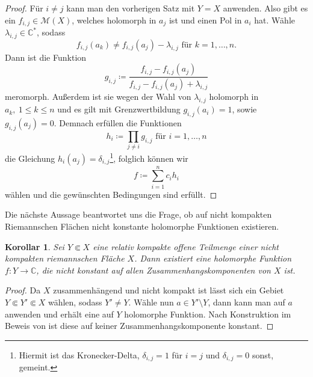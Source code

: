 \documentclass[11pt,a4paper,toc=bibliography]{scrartcl}
\theoremstyle{def}
\theoremstyle{thm}
\newtheorem{koro}[defi]{Korollar}
\theoremstyle{remark}
\begin{document}
\begin{proof}
Für $i\neq j$ kann man den vorherigen Satz mit $Y=X$ anwenden. Also gibt es ein $f_{i,j}\in\mathcal{M}(X)$, welches holomorph in $a_j$ ist und einen Pol in $a_i$ hat. Wähle $\lambda_{i,j}\in \mathbb{C}^*$, sodass 
\[
f_{i,j}(a_k) \neq f_{i,j}(a_j)-\lambda_{i,j} \text{ für } k=1,\ldots,n.
\]
Dann ist die Funktion 
\[
g_{i,j}\coloneqq \frac{f_{i,j}-f_{i,j}(a_j)}{f_{i,j}-f_{i,j}(a_j)+\lambda_{i,j}}
\]
meromorph. Außerdem ist sie wegen der Wahl von $\lambda_{i,j}$ holomorph in $a_k,~1\leq k\leq n$ und es gilt mit Grenzwertbildung $g_{i,j}(a_i)=1$, sowie $g_{i,j}(a_j)=0.$
Demnach erfüllen die Funktionen
\[
h_i\coloneqq \prod_{j\neq i} g_{i,j} \text{ für } i=1,\ldots,n
\]
die Gleichung $h_i(a_j)=\delta_{i,j}$\footnote{
Hiermit ist das Kronecker-Delta, $\delta_{i,j}=1$ für $i=j$ und $\delta_{i,j}=0$ sonst, gemeint.
}, folglich können wir 
\[
f \coloneqq \sum_{i=1}^{n}c_i h_i
\]
wählen und die gewünschten Bedingungen sind erfüllt.
\end{proof}
Die nächste Aussage beantwortet uns die Frage, ob auf nicht kompakten Riemannschen Flächen nicht konstante holomorphe Funktionen existieren.
\begin{koro}
Sei $Y\Subset X$ eine relativ kompakte offene Teilmenge einer nicht kompakten riemannschen Fläche $X$. Dann existiert eine holomorphe Funktion $f:Y\rightarrow \mathbb{C}$, die nicht konstant auf allen Zusammenhangskomponenten von $X$ ist.
\end{koro}
\begin{proof}
Da $X$ zusammenhängend und nicht kompakt ist lässt sich ein Gebiet $Y\Subset Y'\Subset X$ wählen, sodass $Y'\neq Y$. Wähle nun $a\in Y'\setminus Y$, dann kann man  auf $a$ anwenden und erhält eine auf $Y$ holomorphe Funktion. Nach Konstruktion im Beweis von  ist diese auf keiner Zusammenhangskomponente konstant.
\end{proof}
\end{document}
